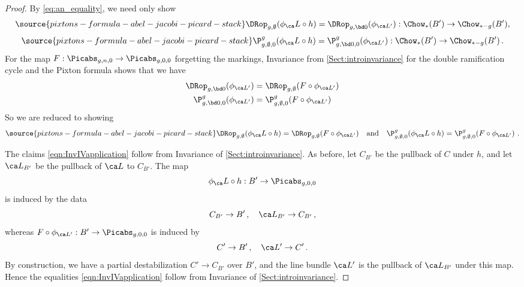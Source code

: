 \begin{proof}
By \eqref{eq:an_equality}, we need only show
\begin{equation}\label{eq:pullback_Div}
\source{pixtons-formula-abel-jacobi-picard-stack}
\DRop_{g, \emptyset}(\phi_\ca L\circ h)  =  \DRop_{g,\bd 0}(\phi_{\ca L'})
:\Chow_*(B') \to \Chow_{*-g}(B'),
\end{equation}
\begin{equation}\label{eq:pullback_pixton}
\source{pixtons-formula-abel-jacobi-picard-stack}
\P_{g,\emptyset, 0}^g(\phi_\ca L \circ h) = \P_{g,\bd 0, 0}^g(\phi_{\ca L'})
:\Chow_*(B') \to \Chow_{*-g}(B')
\, .
\end{equation}
For the map $F : \Picabs_{g,n,0} \to \Picabs_{g,0,0}$ forgetting the markings, Invariance \invnrn{} from \cref{Sect:introinvariance} for the double ramification cycle and the Pixton formula shows that
we have
\begin{align*}
\DRop_{g,\bd 0}(\phi_{\ca L'})
&= \DRop_{g,\emptyset}(F \circ \phi_{\ca L'})  \\
\P_{g,\bd 0, 0}^g(\phi_{\ca L'})
&= \P_{g,\emptyset, 0}^g(F \circ \phi_{\ca L'})
\end{align*}
So we are reduced to showing
\begin{equation} \label{eqn:InvIVapplication}
\source{pixtons-formula-abel-jacobi-picard-stack}
    \DRop_{g, \emptyset}(\phi_\ca L\circ h) = \DRop_{g, \emptyset}(F \circ \phi_{\ca L'})\ \ \text{ and }\ \ \P_{g,\emptyset, 0}^g(\phi_\ca L\circ h) = \P_{g,\emptyset, 0}^g(F \circ \phi_{\ca L'})\ .
\end{equation}


The claims \eqref{eqn:InvIVapplication} follow from
 Invariance \invnrIV{} of \cref{Sect:introinvariance}. As before, let
 $C_{B'}$ be the pullback of $C$ under $h$,  and let
 $\ca L_{B'}$ be the pullback of $\ca L$ to $C_{B'}$. The map
 $$\phi_\ca L\circ h  : B' \to \Picabs_{g,0,0}$$
 is induced by the data
\[C_{B'} \to B'\, ,\ \ \ \ca L_{B'} \to C_{B'}\, ,\]
whereas $F \circ \phi_{\ca L'} : B' \to \Picabs_{g,0,0}$ is induced by
\[C' \to B'\, ,\ \ \  \ca L'\to C'\,.\]
By construction, we have a partial destabilization $C' \to C_{B'}$ over $B'$, and the line bundle $\ca L'$ is the pullback of $\ca L_{B'}$ under this map. Hence the equalities \eqref{eqn:InvIVapplication} follow from Invariance \invnrIV{} of \cref{Sect:introinvariance}.
\end{proof}
